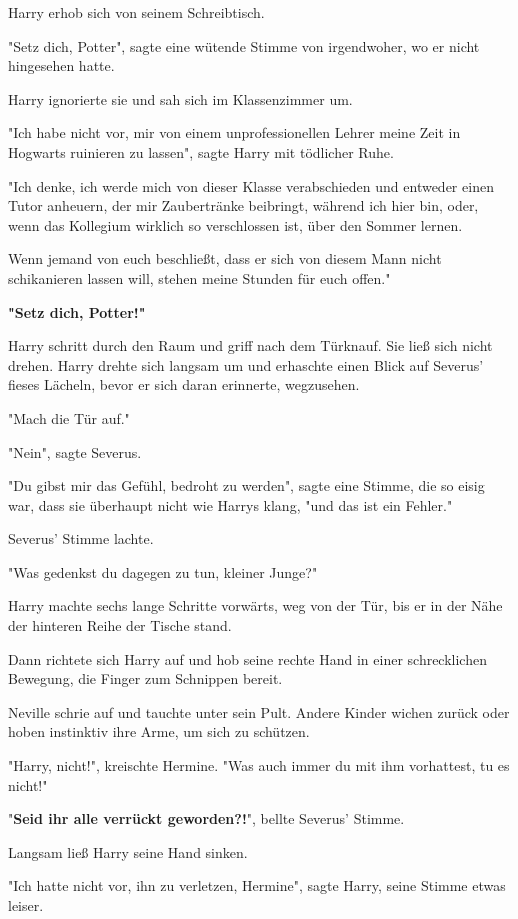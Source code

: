 {Harry erhob sich von seinem Schreibtisch.

"Setz dich, Potter", sagte eine wütende Stimme von irgendwoher, wo er nicht hingesehen hatte.

Harry ignorierte sie und sah sich im Klassenzimmer um.

"Ich habe nicht vor, mir von einem unprofessionellen Lehrer meine Zeit in Hogwarts ruinieren zu lassen", sagte Harry mit tödlicher Ruhe.

"Ich denke, ich werde mich von dieser Klasse verabschieden und entweder einen Tutor anheuern, der mir Zaubertränke beibringt, während ich hier bin, oder, wenn das Kollegium wirklich so verschlossen ist, über den Sommer lernen.

Wenn jemand von euch beschließt, dass er sich von diesem Mann nicht schikanieren lassen will, stehen meine Stunden für euch offen."

\textbf{"Setz dich, Potter!"}

Harry schritt durch den Raum und griff nach dem Türknauf. Sie ließ sich nicht drehen. Harry drehte sich langsam um und erhaschte einen Blick auf Severus' fieses Lächeln, bevor er sich daran erinnerte, wegzusehen.

"Mach die Tür auf."

"Nein", sagte Severus.

"Du gibst mir das Gefühl, bedroht zu werden", sagte eine Stimme, die so eisig war, dass sie überhaupt nicht wie Harrys klang, "und das ist ein Fehler."

Severus' Stimme lachte.

"Was gedenkst du dagegen zu tun, kleiner Junge?"

Harry machte sechs lange Schritte vorwärts, weg von der Tür, bis er in der Nähe der hinteren Reihe der Tische stand.

Dann richtete sich Harry auf und hob seine rechte Hand in einer schrecklichen Bewegung, die Finger zum Schnippen bereit.

Neville schrie auf und tauchte unter sein Pult. Andere Kinder wichen zurück oder hoben instinktiv ihre Arme, um sich zu schützen.

"Harry, nicht!", kreischte Hermine. "Was auch immer du mit ihm vorhattest, tu es nicht!"

"\textbf{Seid ihr alle verrückt geworden?!}", bellte Severus' Stimme.

Langsam ließ Harry seine Hand sinken.

"Ich hatte nicht vor, ihn zu verletzen, Hermine", sagte Harry, seine Stimme etwas leiser.

}
